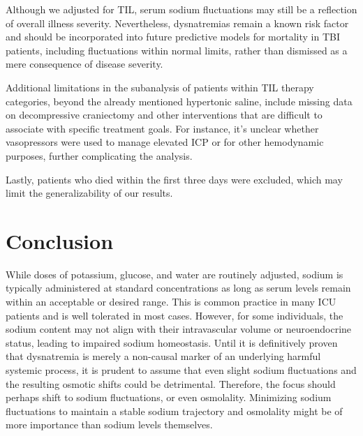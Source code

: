 Although we adjusted for TIL, serum sodium fluctuations may still be a reflection of overall illness severity. Nevertheless, dysnatremias remain a known risk factor and should be incorporated into future predictive models for mortality in TBI patients, including fluctuations within normal limits, rather than dismissed as a mere consequence of disease severity.

Additional limitations in the subanalysis of patients within TIL therapy categories, beyond the already mentioned hypertonic saline, include missing data on decompressive craniectomy\cite{kimRecentUpdatesControversies2023a} and other interventions that are difficult to associate with specific treatment goals. For instance, it’s unclear whether vasopressors were used to manage elevated ICP or for other hemodynamic purposes, further complicating the analysis.

Lastly, patients who died within the first three days were excluded, which may limit the generalizability of our results.


\section{Conclusion}
While doses of potassium, glucose, and water are routinely adjusted, sodium is typically administered at standard concentrations as long as serum levels remain within an acceptable or desired range. This is common practice in many ICU patients and is well tolerated in most cases. However, for some individuals, the sodium content may not align with their intravascular volume or neuroendocrine status, leading to impaired sodium homeostasis. Until it is definitively proven that dysnatremia is merely a non-causal marker of an underlying harmful systemic process, it is prudent to assume that even slight sodium fluctuations and the resulting osmotic shifts could be detrimental. Therefore, the focus should perhaps shift to sodium fluctuations, or even osmolality. Minimizing sodium fluctuations to maintain a stable sodium trajectory and osmolality might be of more importance than sodium levels themselves.





